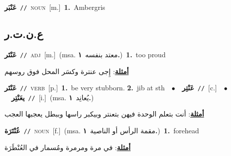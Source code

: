 \documentclass[10pt,a4paper,twoside]{article} %
\begin{document}
\begin{multicols}{2}
{\setlength\topsep{0pt}\textbf{\foreignlanguage{arabic}{عَنْبَر}}\ {\color{gray}\texttt{//}\color{black}}\ \textsc{noun}\ [m.]\ \textbf{1.}~Ambergris\ } \vspace{2mm}

\vspace{-3mm}
\subsection*{\color{blue}\foreignlanguage{arabic}{ع.ن.ت.ر}\color{blue}{}} 

{\setlength\topsep{0pt}\textbf{\foreignlanguage{arabic}{عَنْتَر}}\ {\color{gray}\texttt{//}\color{black}}\ \textsc{adj}\ [m.]\ \color{gray}(msa. \foreignlanguage{arabic}{معتد بنفسه}~\foreignlanguage{arabic}{\textbf{١.}})\color{black}\ \textbf{1.}~too proud\  \begin{flushright}\color{gray}\foreignlanguage{arabic}{\textbf{\underline{\foreignlanguage{arabic}{أمثلة}}}: إِجى عنترة وكسَر المحل فوق روسهم}\end{flushright}\color{black}} \vspace{2mm}

{\setlength\topsep{0pt}\textbf{\foreignlanguage{arabic}{عَنْتَر}}\ {\color{gray}\texttt{//}\color{black}}\ \textsc{verb}\ [p.]\ \textbf{1.}~be very stubborn.  \textbf{2.}~jib at sth\ \ $\bullet$\ \ \setlength\topsep{0pt}\textbf{\foreignlanguage{arabic}{عَنْتِر}}\ {\color{gray}\texttt{//}\color{black}}\ [c.]\ \ $\bullet$\ \ \setlength\topsep{0pt}\textbf{\foreignlanguage{arabic}{يعَنْتِر}}\ {\color{gray}\texttt{//}\color{black}}\ [i.]\ \color{gray}(msa. \foreignlanguage{arabic}{يُعانِد}~\foreignlanguage{arabic}{\textbf{١.}})\color{black}\  \begin{flushright}\color{gray}\foreignlanguage{arabic}{\textbf{\underline{\foreignlanguage{arabic}{أمثلة}}}: أنت بتعلم الوحدة فيهن بتعنتر وبيكبر راسها وببطل يعجبها العجب}\end{flushright}\color{black}} \vspace{2mm}

{\setlength\topsep{0pt}\textbf{\foreignlanguage{arabic}{عُنْتَرَة}}\ {\color{gray}\texttt{//}\color{black}}\ \textsc{noun}\ [f.]\ \color{gray}(msa. \foreignlanguage{arabic}{مقمة الرأس أو الناصية}~\foreignlanguage{arabic}{\textbf{١.}})\color{black}\ \textbf{1.}~forehead\  \begin{flushright}\color{gray}\foreignlanguage{arabic}{\textbf{\underline{\foreignlanguage{arabic}{أمثلة}}}: في مرة ومرمرة ومُسمار في العُنْطَرَة}\end{flushright}\color{black}} \vspace{2mm}


\end{multicols}
\end{document}
